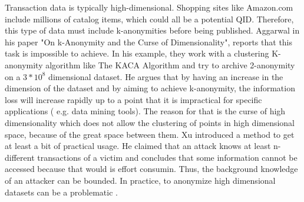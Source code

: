 \documentclass{llncs}
\begin{document}
Transaction data is typically high-dimensional. Shopping sites like Amazon.com include millions of catalog items, which could all be a potential QID. Therefore, this type of data must include k-anonymities before being published\cite{wang2010privacy}. Aggarwal in his paper "On k-Anonymity and the Curse of Dimensionality", reports that this task is impossible to achieve. In his example, they work with a clustering K-anonymity algorithm like The KACA Algorithm and try to archive 2-anonymity on a $3*10^8$ dimensional dataset. He argues that by having an increase in the dimension of the dataset and by aiming to achieve k-anonymity, the information loss will increase rapidly up to a point that it is impractical for specific applications ( e.g. data mining tools).  The reason for that is the curse of high dimensionality which does not allow the clustering of points in high dimensional space, because of the great space between them. Xu introduced a method to get at least a bit of practical usage. He claimed that an attack knows at least n-different transactions of a victim and concludes that some information cannot be accessed because that would is effort consumin\cite{xu2008publishing}. Thus, the background knowledge of an attacker can be bounded. In practice, to anonymize high dimensional datasets can be a problematic \cite{aggarwal2005k}.

\end{document}
